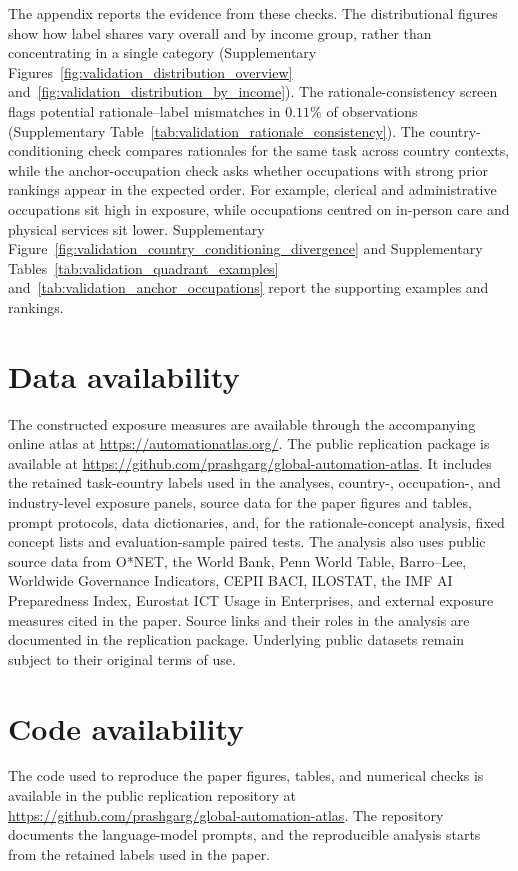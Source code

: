 \documentclass[11pt]{article}
\begin{document}
The appendix reports the evidence from these checks. The distributional figures show how label shares vary overall and by income group, rather than concentrating in a single category (Supplementary Figures~\ref{fig:validation_distribution_overview} and~\ref{fig:validation_distribution_by_income}). The rationale-consistency screen flags potential rationale--label mismatches in $0.11\%$ of observations (Supplementary Table~\ref{tab:validation_rationale_consistency}). The country-conditioning check compares rationales for the same task across country contexts, while the anchor-occupation check asks whether occupations with strong prior rankings appear in the expected order. For example, clerical and administrative occupations sit high in exposure, while occupations centred on in-person care and physical services sit lower. Supplementary Figure~\ref{fig:validation_country_conditioning_divergence} and Supplementary Tables~\ref{tab:validation_quadrant_examples} and~\ref{tab:validation_anchor_occupations} report the supporting examples and rankings.

\section*{Data availability}
The constructed exposure measures are available through the accompanying online atlas at \url{https://automationatlas.org/}. The public replication package is available at \url{https://github.com/prashgarg/global-automation-atlas}. It includes the retained task-country labels used in the analyses, country-, occupation-, and industry-level exposure panels, source data for the paper figures and tables, prompt protocols, data dictionaries, and, for the rationale-concept analysis, fixed concept lists and evaluation-sample paired tests. The analysis also uses public source data from O*NET, the World Bank, Penn World Table, Barro--Lee, Worldwide Governance Indicators, CEPII BACI, ILOSTAT, the IMF AI Preparedness Index, Eurostat ICT Usage in Enterprises, and external exposure measures cited in the paper. Source links and their roles in the analysis are documented in the replication package. Underlying public datasets remain subject to their original terms of use.

\section*{Code availability}
The code used to reproduce the paper figures, tables, and numerical checks is available in the public replication repository at \url{https://github.com/prashgarg/global-automation-atlas}. The repository documents the language-model prompts, and the reproducible analysis starts from the retained labels used in the paper.
\end{document}
